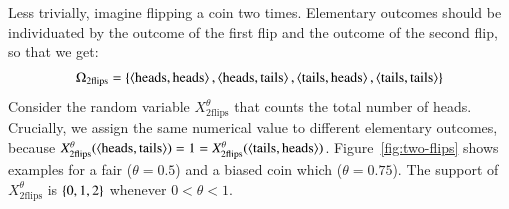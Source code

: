 \documentclass[nobib,nofonts]{tufte-handout}
\begin{document}
\begin{example}
  Less trivially, imagine flipping a coin two times. Elementary outcomes should be individuated by the outcome of the first flip and the outcome of the second flip, so that we get:
  \begin{align*}
    \Omega_{\text{2flips}} = \left\{\left \langle \text{heads}, \text{heads}\right\rangle, \left \langle \text{heads}, \text{tails}\right\rangle,
    \left \langle \text{tails}, \text{heads}\right\rangle, \left \langle \text{tails}, \text{tails}\right\rangle\right\}
  \end{align*}
  Consider the random variable $X_{\text{2flips}}^{\theta}$ that counts the total number of heads.
  Crucially, we assign the same numerical value to different elementary outcomes, because $X_{\text{2flips}}^{\theta}(\left \langle \text{heads}, \text{tails}\right\rangle) = 1 = X_{\text{2flips}}^{\theta}(\left \langle \text{tails}, \text{heads}\right\rangle)$.
  Figure~\ref{fig:two-flips} shows examples for a fair ($\theta = 0.5$) and a biased coin which ($\theta=0.75$).
  The support of $X_{\text{2flips}}^{\theta}$ is $\left\{0,1,2\right\}$ whenever $0 < \theta < 1$.

  \begin{figure}
  \centering
  \twoFlips

  \hfill


\end{figure}
\end{example}
\end{document}
